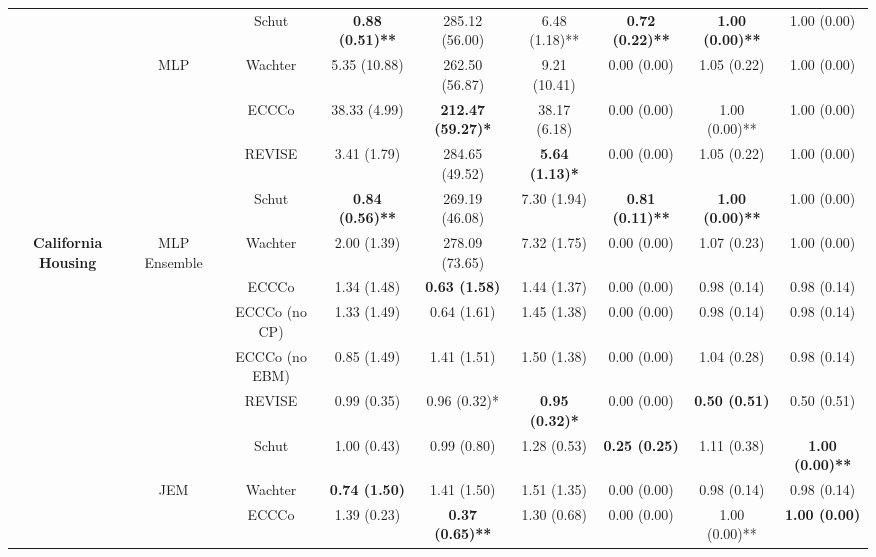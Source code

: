 \begin{table}
{\begin{tabular}[t]{>{}c|c|c|c|c|c|c|c|c}
 &  & Schut & \textbf{0.88 (0.51)**} & 285.12 (56.00) & 6.48 (1.18)** & \textbf{0.72 (0.22)**} & \textbf{1.00 (0.00)**} & 1.00 (0.00)\\

 & \multirow{-4}{*}{\centering\arraybackslash MLP} & Wachter & 5.35 (10.88) & 262.50 (56.87) & 9.21 (10.41) & 0.00 (0.00) & 1.05 (0.22) & 1.00 (0.00)\\
\cline{2-9}
 &  & ECCCo & 38.33 (4.99) & \textbf{212.47 (59.27)*} & 38.17 (6.18) & 0.00 (0.00) & 1.00 (0.00)** & 1.00 (0.00)\\

 &  & REVISE & 3.41 (1.79) & 284.65 (49.52) & \textbf{5.64 (1.13)*} & 0.00 (0.00) & 1.05 (0.22) & 1.00 (0.00)\\

 &  & Schut & \textbf{0.84 (0.56)**} & 269.19 (46.08) & 7.30 (1.94) & \textbf{0.81 (0.11)**} & \textbf{1.00 (0.00)**} & 1.00 (0.00)\\

\multirow{-16}{*}{\centering\arraybackslash \textbf{California Housing}} & \multirow{-4}{*}{\centering\arraybackslash MLP Ensemble} & Wachter & 2.00 (1.39) & 278.09 (73.65) & 7.32 (1.75) & 0.00 (0.00) & 1.07 (0.23) & 1.00 (0.00)\\
\cline{1-9}
 &  & ECCCo & 1.34 (1.48) & \textbf{0.63 (1.58)} & 1.44 (1.37) & 0.00 (0.00) & 0.98 (0.14) & 0.98 (0.14)\\

 &  & ECCCo (no CP) & 1.33 (1.49) & 0.64 (1.61) & 1.45 (1.38) & 0.00 (0.00) & 0.98 (0.14) & 0.98 (0.14)\\

 &  & ECCCo (no EBM) & 0.85 (1.49) & 1.41 (1.51) & 1.50 (1.38) & 0.00 (0.00) & 1.04 (0.28) & 0.98 (0.14)\\

 &  & REVISE & 0.99 (0.35) & 0.96 (0.32)* & \textbf{0.95 (0.32)*} & 0.00 (0.00) & \textbf{0.50 (0.51)} & 0.50 (0.51)\\

 &  & Schut & 1.00 (0.43) & 0.99 (0.80) & 1.28 (0.53) & \textbf{0.25 (0.25)} & 1.11 (0.38) & \textbf{1.00 (0.00)**}\\

 & \multirow{-6}{*}{\centering\arraybackslash JEM} & Wachter & \textbf{0.74 (1.50)} & 1.41 (1.50) & 1.51 (1.35) & 0.00 (0.00) & 0.98 (0.14) & 0.98 (0.14)\\
\cline{2-9}
 &  & ECCCo & 1.39 (0.23) & \textbf{0.37 (0.65)**} & 1.30 (0.68) & 0.00 (0.00) & 1.00 (0.00)** & \textbf{1.00 (0.00)}\\


\end{tabular}}
\end{table}

